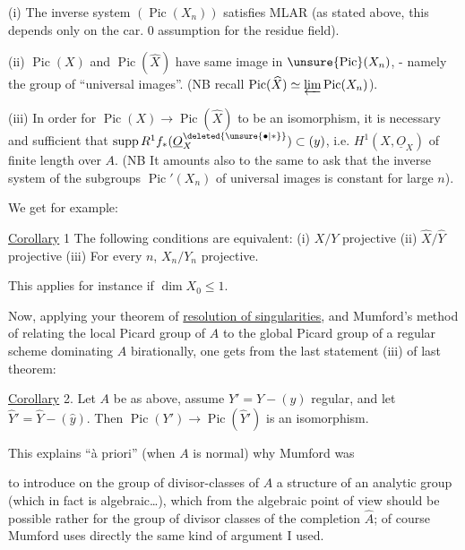 (i) The inverse system $(\operatorname{Pic}(X_n))$ satisfies MLAR (as stated above, this depends only on the car. 0 assumption for the residue field).

(ii) $\operatorname{Pic}(X)$ and $\operatorname{Pic}(\widehat{X})$ have same image in $\unsure{\operatorname{Pic}}(X_n)$, - namely the group of ``universal images''. (NB recall $\operatorname{Pic}(\widehat{X})\simeq\varprojlim\operatorname{Pic}(X_n)$).

(iii) In order for $\operatorname{Pic}(X)\longrightarrow\operatorname{Pic}(\widehat{X})$ to be an isomorphism, it is necessary and sufficient that $\operatorname{supp}R^1f_*(\underline{O}_X^{\deleted{\unsure{\bullet|*}}})\subset(y)$, i.e. $H^1(X,\underline{O}_X)$ of finite length over $A$. (NB It amounts also to the same to  ask that the inverse system of the subgroups $\operatorname{Pic}'(X_n)$ of universal images is constant for large $n$).

We get for example:

\uline{Corollary} 1 The following conditions are equivalent: (i) $X/Y$ projective (ii) $\widehat{X}/\widehat{Y}$ projective (iii) For every $n$, $X_n/Y_n$ projective.

This applies for instance if $\dim X_0\leq1$.

Now, applying your theorem of \uline{resolution of singularities}, and Mumford's method of relating the local Picard group of $A$ to the global Picard group of a regular scheme dominating $A$ birationally, one gets from the last statement  (iii) of last theorem:

\uline{Corollary} 2. Let $A$ be as above, assume  $Y'=Y-(y)$ regular, and let $\widehat{Y}'=\widehat{Y}-(\widehat{y})$. Then $\operatorname{Pic}(Y')\longrightarrow\operatorname{Pic}(\widehat{Y}')$ is an isomorphism.

This explains ``à priori'' (when $A$ is normal) why Mumford was



 to introduce  on the group of divisor-classes of $A$ a structure of an analytic group (which in fact is algebraic\ldots), which from the algebraic point of view should be possible rather for the group of divisor classes of the completion $\widehat{A}$; of course Mumford uses directly the same kind of argument I used.

